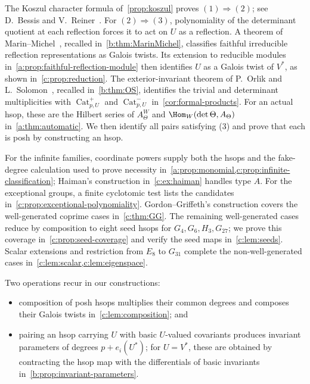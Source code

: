 \documentclass[11pt]{amsart}
\DeclareMathOperator{\Cat}{Cat}
\theoremstyle{definition}
\begin{document}
The Koszul character formula of~\cref{prop:koszul} proves
$(1)\Rightarrow(2)$; see D.~Bessis and V.~Reiner~\cite[Proposition~4.2 and its proof]{BR}.
For $(2)\Rightarrow(3)$, polynomiality of the determinant quotient
at each reflection forces it to act on $U$ as a reflection.
A theorem of Marin--Michel~\cite[Theorem~1.2]{MarinMichel}, recalled
in~\cref{b:thm:MarinMichel}, classifies faithful irreducible reflection
representations as Galois twists. Its extension to reducible modules
in~\cref{a:prop:faithful-reflection-module} then identifies $U$ as a
Galois twist of $V^*$, as shown in~\cref{c:prop:reduction}.
The exterior-invariant theorem of P.~Orlik and L.~Solomon~\cite[Theorem~3.1]{OS},
recalled in~\cref{b:thm:OS}, identifies the trivial and determinant
multiplicities with $\Cat^+_{p,U}$ and $\Cat^-_{p,U}$
in~\cref{cor:formal-products}. For an actual hsop, these are the
Hilbert series of $A_\Theta^W$ and $\Hom_W(\det\Theta,A_\Theta)$
in~\cref{a:thm:automatic}.
We then identify all pairs satisfying (3) and prove that each is posh
by constructing an hsop.

For the infinite families, coordinate powers supply both the hsops
and the fake-degree calculation used to prove necessity
in~\cref{a:prop:monomial,c:prop:infinite-classification}; Haiman's
construction in~\cref{c:ex:haiman} handles type $A$.
For the exceptional groups, a finite cyclotomic test lists the
candidates in~\cref{c:prop:exceptional-polynomiality}.
Gordon--Griffeth's construction covers the well-generated coprime
cases in~\cref{c:thm:GG}. The remaining well-generated cases reduce
by composition to eight seed hsops for $G_4,G_6,H_3,G_{27}$;
we prove this coverage in~\cref{c:prop:seed-coverage} and verify
the seed maps in~\cref{c:lem:seeds}.
Scalar extensions and restriction from $E_8$ to $G_{31}$ complete
the non-well-generated cases in~\cref{c:lem:scalar,c:lem:eigenspace}.

Two operations recur in our constructions:
\begin{itemize}
\item composition of posh hsops multiplies their common degrees and
composes their Galois twists in~\cref{c:lem:composition}; and
\item pairing an hsop carrying $U$ with basic $U$-valued covariants
produces invariant parameters of degrees $p+e_i(U^*)$;
for $U=V^*$, these are obtained by contracting the hsop map with
the differentials of basic invariants in~\cref{b:prop:invariant-parameters}.
\end{itemize}
\end{document}
